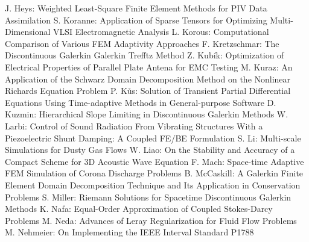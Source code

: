 \documentclass[10pt, A4]{article}%
\begin{document}
{J. Heys}: {Weighted Least-Square Finite Element Methods for PIV Data Assimilation}
{S. Koranne}: {Application of Sparse Tensors for Optimizing Multi-Dimensional VLSI Electromagnetic Analysis}
{L. Korous}: {Computational Comparison of Various FEM Adaptivity Approaches}
{F. Kretzschmar}: {The Discontinuous Galerkin Galerkin Trefftz Method}
{Z. Kubík}: {Optimization of Electrical Properties of Parallel Plate Antena for EMC Testing}
{M. Kuraz}: {An Application of the Schwarz Domain Decomposition Method on the Nonlinear Richards Equation Problem}
{P. Kůs}: {Solution of Transient Partial Differential Equations Using Time-adaptive Methods in General-purpose Software}
{D. Kuzmin}: {Hierarchical Slope Limiting in Discontinuous Galerkin Methods}
{W. Larbi}: {Control of Sound Radiation From Vibrating Structures With a Piezoelectric Shunt Damping: A Coupled FE/BE Formulation}
{S. Li}: {Multi-scale Simulations for Dusty Gas Flows}
{W. Liao}: {On the Stability and Accuracy of a Compact Scheme for 3D Acoustic Wave Equation}
{F. Mach}: {Space-time Adaptive FEM Simulation of Corona Discharge Problems}
{B. McCaskill}: {A Galerkin Finite Element Domain Decomposition Technique and Its Application in Conservation Problems}
{S. Miller}: {Riemann Solutions for Spacetime Discontinuous Galerkin Methods}
{K. Nafa}: {Equal-Order Approximation of Coupled Stokes-Darcy Problems}
{M. Neda}: {Advances of Leray Regularization for Fluid Flow Problems}
{M. Nehmeier}: {On Implementing  the IEEE Interval Standard P1788}
\end{document}
